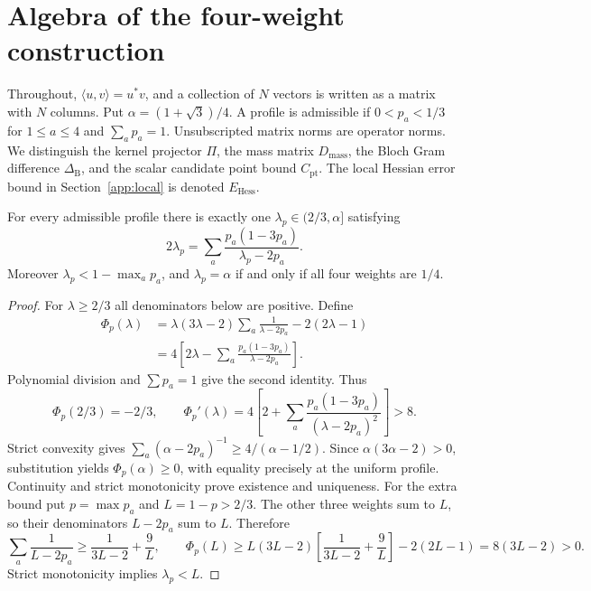 \section{Algebra of the four-weight construction}\label{app:candidate}
\label{alg:section}

Throughout, $\langle u,v\rangle=u^*v$, and a collection of $N$ vectors is
written as a matrix with $N$ columns. Put $\alpha=(1+\sqrt3)/4$.
A profile is admissible if $0<p_a<1/3$ for $1\leq a\leq4$ and
$\sum_a p_a=1$. Unsubscripted matrix norms are operator norms.
We distinguish the kernel projector $\Pi$, the mass matrix
$D_{\mathrm{mass}}$, the Bloch Gram difference $\Delta_{\mathrm B}$,
and the scalar candidate point bound $C_{\mathrm{pt}}$.
The local Hessian error bound in Section~\ref{app:local} is denoted
$E_{\mathrm{Hess}}$.

\begin{lemma}\label{alg:root}
For every admissible profile there is exactly one
$\lambda_p\in(2/3,\alpha]$ satisfying
\begin{equation}\label{alg:root-equation}
 2\lambda_p=\sum_a\frac{p_a(1-3p_a)}{\lambda_p-2p_a}.
\end{equation}
Moreover $\lambda_p<1-\max_a p_a$, and $\lambda_p=\alpha$ if and only if
all four weights are $1/4$.
\end{lemma}
\begin{proof}
For $\lambda\geq2/3$ all denominators below are positive. Define
\begin{align}
 \Phi_p(\lambda)
 &=\lambda(3\lambda-2)\sum_a\frac1{\lambda-2p_a}
                  -2(2\lambda-1)\label{alg:Phi}\\
 &=4\left[2\lambda-\sum_a\frac{p_a(1-3p_a)}{\lambda-2p_a}\right].
 \nonumber
\end{align}
Polynomial division and $\sum p_a=1$ give the second identity. Thus
\[
 \Phi_p(2/3)=-2/3,\qquad
 \Phi_p'(\lambda)=4\left[2+
 \sum_a\frac{p_a(1-3p_a)}{(\lambda-2p_a)^2}\right]>8.
\]
Strict convexity gives $\sum_a(\alpha-2p_a)^{-1}\geq4/(\alpha-1/2)$.
Since $\alpha(3\alpha-2)>0$, substitution yields
$\Phi_p(\alpha)\geq0$, with equality precisely at the uniform profile.
Continuity and strict monotonicity prove existence and uniqueness.
For the extra bound put $p=\max p_a$ and $L=1-p>2/3$. The other three
weights sum to $L$, so their denominators $L-2p_a$ sum to $L$. Therefore
\[
 \sum_a\frac1{L-2p_a}\geq\frac1{3L-2}+\frac9L,\qquad
 \Phi_p(L)\geq L(3L-2)\left[\frac1{3L-2}+\frac9L\right]
                 -2(2L-1)=8(3L-2)>0.
\]
Strict monotonicity implies $\lambda_p<L$.
\end{proof}


